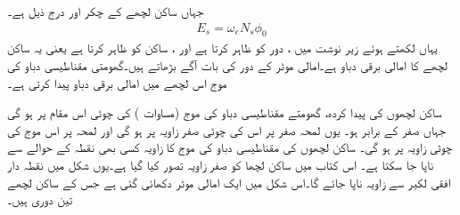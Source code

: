 جہاں  ساکن لچھے کے چکر  اور  درج ذیل ہے۔
\begin{align}\label{مساوات_امالی_ساکن_لچھوں_میں_امالی_برقی_دباو}
E_s=\omega_e N_s \phi_0
\end{align}
یہاں   لکھتے ہوئے  زیر نوشت  میں  ،  دور  کو ظاہر کرتا ہے اور ، ساکن کو ظاہر کرتا ہے یعنی یہ ساکن   لچھے کا امالی برقی دباو ہے۔امالی موٹر کے  دور   کی بات آگے بڑھاتے ہیں۔گھومتی مقناطیسی دباو کی موج اس  لچھے میں امالی برقی دباو  پیدا کرتی ہے۔

ساکن لچھوں کی پیدا کردہ، گھومتے مقناطیسی دباو کی موج (مساوات )  کی چوٹی اس مقام پر ہو گی جہاں  صفر کے برابر ہو۔ یوں لمحہ صفر پر اس کی چوٹی صفر زاویہ
  پر ہو گی اور لمحہ  پر اس موج کی چوٹی زاویہ  پر ہو گی۔ ساکن لچھوں کی مقناطیسی دباو کی موج کا زاویہ کسی بھی نقطہ کے حوالے سے ناپا  جا سکتا ہے۔ اس کتاب میں ساکن لچھا   کو صفر زاویہ تصور کیا گیا ہے۔یوں شکل   میں  نقطہ دار افقی لکیر سے  زاویہ   ناپا جائے گا۔اس شکل میں ایک امالی موٹر دکھائی گئی ہے جس کے  ساکن لچھے تین دوری ہیں۔

